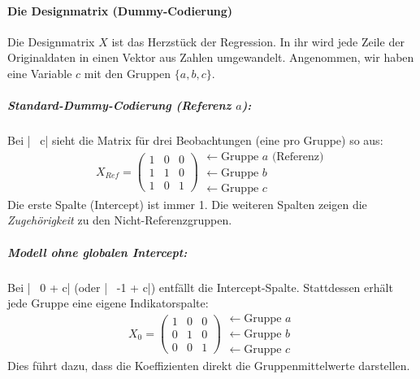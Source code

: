 \documentclass[10pt,twocolumn]{scrartcl}
\renewcommand{\lstinline}{\mycoloredinline}
\begin{document}
\paragraph{Die Designmatrix (Dummy-Codierung)}
Die Designmatrix $X$ ist das Herzstück der Regression. In ihr wird jede Zeile der Originaldaten in einen Vektor aus Zahlen umgewandelt. Angenommen, wir haben eine Variable $c$ mit den Gruppen $\{a, b, c\}$.

\subparagraph{Standard-Dummy-Codierung (Referenz $a$):}
Bei \lstinline|~ c| sieht die Matrix für drei Beobachtungen (eine pro Gruppe) so aus:
\begin{equation*}
X_{Ref} = \begin{pmatrix}
1 & 0 & 0 \\
1 & 1 & 0 \\
1 & 0 & 1 
\end{pmatrix}
\begin{array}{l}
\leftarrow \text{Gruppe } a \text{ (Referenz)} \\
\leftarrow \text{Gruppe } b \\
\leftarrow \text{Gruppe } c
\end{array}
\end{equation*}
Die erste Spalte (Intercept) ist immer 1. Die weiteren Spalten zeigen die \emph{Zugehörigkeit} zu den Nicht-Referenzgruppen.

\subparagraph{Modell ohne globalen Intercept:}
Bei \lstinline|~ 0 + c| (oder \lstinline|~ -1 + c|) entfällt die Intercept-Spalte. Stattdessen erhält jede Gruppe eine eigene Indikatorspalte:
\begin{equation*}
X_{0} = \begin{pmatrix}
1 & 0 & 0 \\
0 & 1 & 0 \\
0 & 0 & 1 
\end{pmatrix}
\begin{array}{l}
\leftarrow \text{Gruppe } a \\
\leftarrow \text{Gruppe } b \\
\leftarrow \text{Gruppe } c
\end{array}
\end{equation*}
Dies führt dazu, dass die Koeffizienten direkt die Gruppenmittelwerte darstellen.
\end{document}

